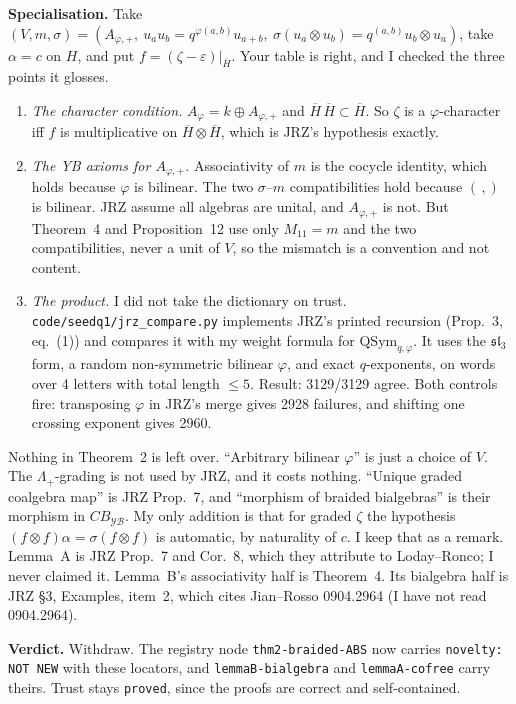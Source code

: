 \documentclass[10pt]{article}
\newcommand{\QSym}{\mathrm{QSym}_{q,\varphi}}
\begin{document}
\textbf{Specialisation.} Take $(V,m,\sigma)=(A_{\varphi,+},\ u_au_b=q^{\varphi(a,b)}u_{a+b},\ \sigma(u_a\otimes u_b)=q^{(a,b)}u_b\otimes u_a)$, take $\alpha=c$ on $H$, and put $f=(\zeta-\varepsilon)|_{\overline H}$. Your table is right, and I checked the three points it glosses.
\begin{enumerate}[label=(\alph*)]
\item \emph{The character condition.} $A_\varphi=k\oplus A_{\varphi,+}$ and $\overline H\,\overline H\subset\overline H$. So $\zeta$ is a $\varphi$-character iff $f$ is multiplicative on $\overline H\otimes\overline H$, which is JRZ's hypothesis exactly.
\item \emph{The YB axioms for $A_{\varphi,+}$.} Associativity of $m$ is the cocycle identity, which holds because $\varphi$ is bilinear. The two $\sigma$--$m$ compatibilities hold because $(\,,)$ is bilinear. JRZ assume all algebras are unital, and $A_{\varphi,+}$ is not. But Theorem~4 and Proposition~12 use only $M_{11}=m$ and the two compatibilities, never a unit of $V$, so the mismatch is a convention and not content.
\item \emph{The product.} I did not take the dictionary on trust. \texttt{code/seedq1/jrz\_compare.py} implements JRZ's printed recursion (Prop.~3, eq.~(1)) and compares it with my weight formula for $\QSym$. It uses the $\mathfrak{sl}_3$ form, a random non-symmetric bilinear $\varphi$, and exact $q$-exponents, on words over 4 letters with total length $\le5$. Result: 3129/3129 agree. Both controls fire: transposing $\varphi$ in JRZ's merge gives 2928 failures, and shifting one crossing exponent gives 2960.
\end{enumerate}
Nothing in Theorem~2 is left over. ``Arbitrary bilinear $\varphi$'' is just a choice of $V$. The $\Lambda_+$-grading is not used by JRZ, and it costs nothing. ``Unique graded coalgebra map'' is JRZ Prop.~7, and ``morphism of braided bialgebras'' is their morphism in $CB_{\mathcal{YB}}$. My only addition is that for graded $\zeta$ the hypothesis $(f\otimes f)\alpha=\sigma(f\otimes f)$ is automatic, by naturality of $c$. I keep that as a remark. Lemma~A is JRZ Prop.~7 and Cor.~8, which they attribute to Loday--Ronco; I never claimed it. Lemma~B's associativity half is Theorem~4. Its bialgebra half is JRZ \S3, Examples, item~2, which cites Jian--Rosso 0904.2964 (I have not read 0904.2964).

\textbf{Verdict.} Withdraw. The registry node \texttt{thm2-braided-ABS} now carries \texttt{novelty: NOT NEW} with these locators, and \texttt{lemmaB-bialgebra} and \texttt{lemmaA-cofree} carry theirs. Trust stays \texttt{proved}, since the proofs are correct and self-contained.
\end{document}

